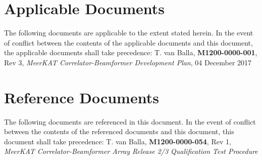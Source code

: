 \section{Applicable Documents}
The following documents are applicable to the extent stated herein. In the event of conflict between the contents of the applicable documents and this document, the applicable documents shall take precedence:\newline\newline
[1]\hspace{10mm} T. van Balla, {\bf M1200-0000-001}, Rev 3, {\it MeerKAT Correlator-Beamformer Development Plan}, 04 December 2017\newline\
\section{Reference Documents}
The following documents are referenced in this document. In the event of conflict between the contents of the referenced documents and this document, this document shall take precedence:\newline\newline
[2]\hspace{10mm} T. van Balla, {\bf M1200-0000-054}, Rev 1, {\it MeerKAT Correlator-Beamformer Array Release 2/3 Qualification Test Procedure}\newline

